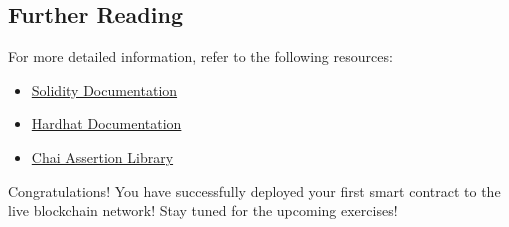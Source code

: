 \documentclass[12pt]{article}
\begin{document}
\subsection{Further Reading}

For more detailed information, refer to the following resources:

\begin{itemize}
    \item \href{https://docs.soliditylang.org/en/v0.8.0/}{Solidity Documentation}
    \item \href{https://hardhat.org/docs}{Hardhat Documentation}
    \item \href{https://www.chaijs.com/}{Chai Assertion Library}

\end{itemize}
Congratulations! You have successfully deployed your first smart contract to the live blockchain network! Stay tuned for the upcoming exercises!
\end{document}
